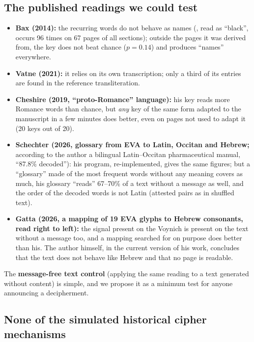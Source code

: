 \subsection{The published readings we could test}

\begin{itemize}
\item \textbf{Bax (2014):} the recurring words do not behave as names (, read as ``black'', occurs 96 times on
  67 pages of all sections); outside the pages it was derived from, the key does not beat chance ($p = 0.14$) and
  produces ``names'' everywhere.
\item \textbf{Vatne (2021):} it relies on its own transcription; only a third of its entries are found in the reference
  transliteration.
\item \textbf{Cheshire (2019, ``proto-Romance'' language):} his key reads more Romance words than chance, but \emph{any}
  key of the same form adapted to the manuscript in a few minutes does better, even on pages not used to adapt it (20 keys
  out of 20).
\item \textbf{Schechter (2026, glossary from EVA to Latin, Occitan and Hebrew;} according to the author a bilingual
  Latin--Occitan pharmaceutical manual, ``87.8\% decoded''): his program, re-implemented, gives the same figures; but a
  ``glossary'' made of the most frequent words without any meaning covers as much, his glossary ``reads'' 67--70\% of a
  text without a message as well, and the order of the decoded words is not Latin (attested pairs as in shuffled text).
\item \textbf{Gatta (2026, a mapping of 19 EVA glyphs to Hebrew consonants, read right to left):} the signal present on
  the Voynich is present on the text without a message too, and a mapping searched for on purpose does better than his.
  The author himself, in the current version of his work, concludes that the text does not behave like Hebrew and that no
  page is readable.
\end{itemize}
The \textbf{message-free text control} (applying the same reading to a text generated without content) is simple, and we
propose it as a minimum test for anyone announcing a decipherment.

\subsection{None of the simulated historical cipher mechanisms}

